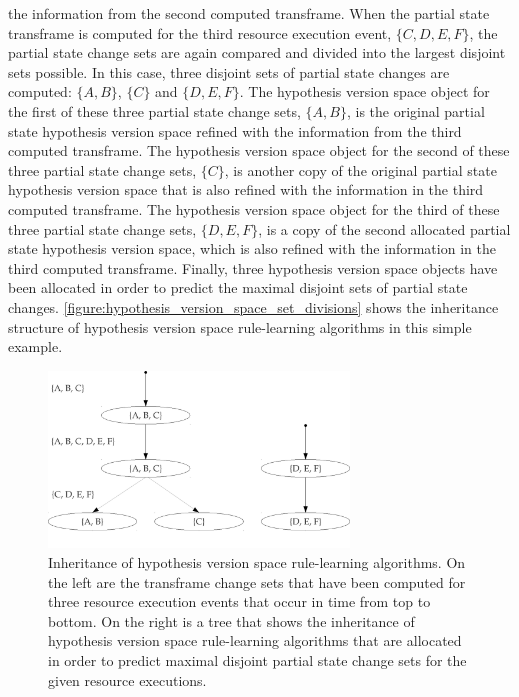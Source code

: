 the information from the second computed transframe.  When the partial
state transframe is computed for the third resource execution event,
$\{C, D, E, F\}$, the partial state change sets are again compared and
divided into the largest disjoint sets possible.  In this case, three
disjoint sets of partial state changes are computed: $\{A, B\}$,
$\{C\}$ and $\{D, E, F\}$.  The hypothesis version space object for
the first of these three partial state change sets, $\{A, B\}$, is the
original partial state hypothesis version space refined with the
information from the third computed transframe.  The hypothesis
version space object for the second of these three partial state
change sets, $\{C\}$, is another copy of the original partial state
hypothesis version space that is also refined with the information in
the third computed transframe.  The hypothesis version space object
for the third of these three partial state change sets, $\{D, E, F\}$,
is a copy of the second allocated partial state hypothesis version
space, which is also refined with the information in the third
computed transframe.  Finally, three hypothesis version space objects
have been allocated in order to predict the maximal disjoint sets of
partial state changes.
{\mbox{\autoref{figure:hypothesis_version_space_set_divisions}}} shows
the inheritance structure of hypothesis version space rule-learning
algorithms in this simple example.
\begin{figure}
\centering
\includegraphics[width=8cm]{gfx/hypothesis_version_space_set_divisions}
\caption[Inheritance of hypothesis version space rule-learning
  algorithms.]{Inheritance of hypothesis version space rule-learning
  algorithms.  On the left are the transframe change sets that have
  been computed for three resource execution events that occur in time
  from top to bottom.  On the right is a tree that shows the
  inheritance of hypothesis version space rule-learning algorithms
  that are allocated in order to predict maximal disjoint partial
  state change sets for the given resource executions.}
\label{figure:hypothesis_version_space_set_divisions}
\end{figure}





